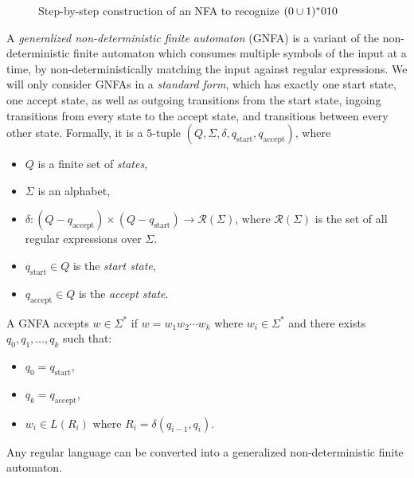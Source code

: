 \begin{exmp}
\begin{figure}[ht!]
        \caption{Step-by-step construction of an NFA to recognize $(0 \cup 1)^{*}010$}
        \label{fig:regex-nfa-construction-example}
    \end{figure}
\end{exmp}

\begin{defn}
    A \emph{generalized non-deterministic finite automaton} (GNFA) is a variant of the non-deterministic finite automaton which consumes multiple symbols of the input at a time, by non-deterministically matching the input against regular expressions. We will only consider GNFAs in a \emph{standard form}, which has exactly one start state, one accept state, as well as outgoing transitions from the start state, ingoing transitions from every state to the accept state, and transitions between every other state. Formally, it is a $5$-tuple $(Q, \Sigma, \delta, q_{\textrm{start}}, q_{\textrm{accept}})$, where
    \begin{itemize}
        \item $Q$ is a finite set of \emph{states},
        \item $\Sigma$ is an alphabet,
        \item $\delta: (Q - q_{\textrm{accept}}) \times \left(Q - q_{\textrm{start}}\right) \to \mathcal{R}(\Sigma)$, where $\mathcal{R}(\Sigma)$ is the set of all regular expressions over $\Sigma$.
        \item $q_{\textrm{start}} \in Q$ is the \emph{start state},
        \item $q_{\textrm{accept}} \in Q$ is the \emph{accept state}.
    \end{itemize}

    A GNFA accepts $w \in \Sigma^{*}$ if $w = w_1w_2\cdots w_k$ where $w_i \in \Sigma^{*}$ and there exists $q_0, q_1, \ldots, q_k$ such that:
    \begin{itemize}
        \item $q_0 = q_{\textrm{start}}$,
        \item $q_k = q_{\textrm{accept}}$,
        \item $w_i \in L(R_i)$ where $R_i = \delta\left(q_{i-1}, q_i\right)$.
    \end{itemize}
\end{defn}

\begin{lemma}\label{dfa-to-gnfa}
    Any regular language can be converted into a generalized non-deterministic finite automaton.
\end{lemma}

